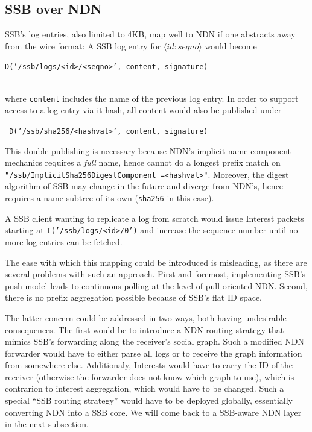 \documentclass[sigconf]{acmart}
\begin{document}
\subsection{SSB over NDN}

SSB's log entries, also limited to 4KB, map well to NDN if one
abstracts away from the wire format: A SSB
log entry for \mbox{$\langle id:seqno\rangle$} would become\\
  \centerline{\tt D('/ssb/logs/<id>/<seqno>', content, signature)} \\
where {\tt content} includes the name of the previous log entry.
In order to support access to a log entry via it hash, all content
would also be published under\\
\centerline{\tt
  D('/ssb/sha256/<hashval>', content, signature)}

\noindent
This double-publishing is necessary because NDN's implicit name
component mechanics requires a {\em full} name, hence cannot do a longest
prefix match on {\tt
  "/ssb/ImplicitSha256DigestComponent =<hashval>"}. Moreover, the digest
algorithm of SSB may change in the future and diverge from NDN's, hence
requires a name subtree of its own ({\tt sha256} in this case).

A SSB client wanting to replicate a log from scratch would issue
Interest packets starting at {\tt I('/ssb/logs/<id>/0')} and increase the
sequence number until no more log entries can be fetched.

The ease with which this mapping could be introduced is misleading, as
there are several problems with such an approach. First and foremost,
implementing SSB's push model leads to continuous polling at the level
of pull-oriented NDN. Second, there is no prefix aggregation possible
because of SSB's flat ID space.

The latter concern could be addressed in two ways, both having
undesirable consequences. The first would be to introduce a NDN
routing strategy that mimics SSB's forwarding along the receiver's
social graph. Such a modified NDN forwarder would have to either parse
all logs or to receive the graph information from somewhere
else. Additionaly, Interests would have to carry the ID of the
receiver (otherwise the forwarder does not know which graph to use),
which is contrarion to interest aggregation, which would have to be
changed.  Such a special ``SSB routing strategy'' would have to be
deployed globally, essentially converting NDN into a SSB core. We will
come back to a SSB-aware NDN layer in the next subsection.
\end{document}
